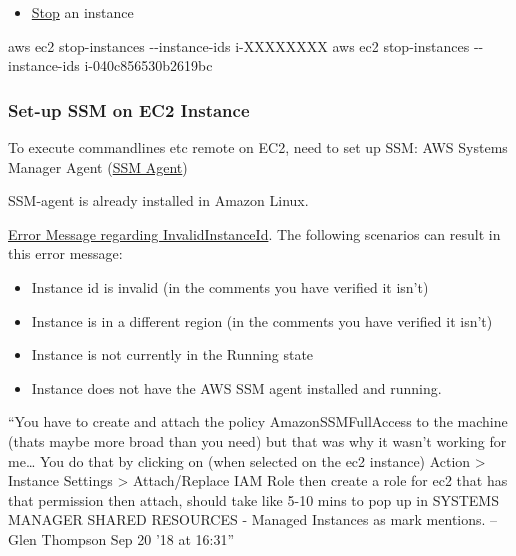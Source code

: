 \documentclass[
]{book}
\newenvironment{Shaded}{\begin{snugshade}}{\end{snugshade}}
\newcommand{\ExtensionTok}[1]{#1}
\newcommand{\NormalTok}[1]{#1}
\providecommand{\tightlist}{%
  \setlength{\itemsep}{0pt}\setlength{\parskip}{0pt}}
\begin{document}
\begin{enumerate}
  \begin{itemize}
  \tightlist
  \item
    \href{https://docs.aws.amazon.com/cli/latest/reference/ec2/stop-instances.html}{Stop} an instance
  \end{itemize}

\begin{Shaded}
\begin{Highlighting}[]
\ExtensionTok{aws}\NormalTok{ ec2 stop{-}instances {-}{-}instance{-}ids i{-}XXXXXXXX}
\ExtensionTok{aws}\NormalTok{ ec2 stop{-}instances {-}{-}instance{-}ids i{-}040c856530b2619bc}
\end{Highlighting}
\end{Shaded}
\end{enumerate}

\hypertarget{set-up-ssm-on-ec2-instance}{%
\subsubsection{Set-up SSM on EC2 Instance}\label{set-up-ssm-on-ec2-instance}}

To execute commandlines etc remote on EC2, need to set up SSM: AWS Systems Manager Agent (\href{https://docs.aws.amazon.com/systems-manager/latest/userguide/ssm-agent.html}{SSM Agent})

SSM-agent is already installed in Amazon Linux.

\href{https://stackoverflow.com/questions/47034797/invalidinstanceid-an-error-occurred-invalidinstanceid-when-calling-the-sendco}{Error Message regarding InvalidInstanceId}. The following scenarios can result in this error message:

\begin{itemize}
\tightlist
\item
  Instance id is invalid (in the comments you have verified it isn't)
\item
  Instance is in a different region (in the comments you have verified it isn't)
\item
  Instance is not currently in the Running state
\item
  Instance does not have the AWS SSM agent installed and running.
\end{itemize}

``You have to create and attach the policy AmazonSSMFullAccess to the machine (thats maybe more broad than you need) but that was why it wasn't working for me\ldots{} You do that by clicking on (when selected on the ec2 instance) Action \textgreater{} Instance Settings \textgreater{} Attach/Replace IAM Role then create a role for ec2 that has that permission then attach, should take like 5-10 mins to pop up in SYSTEMS MANAGER SHARED RESOURCES - Managed Instances as mark mentions. -- Glen Thompson Sep 20 '18 at 16:31''
\end{document}

